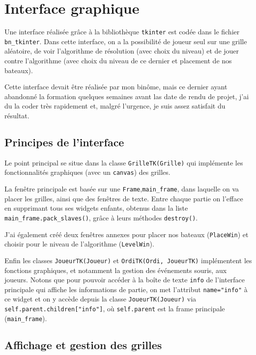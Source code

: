 \chapter{Interface graphique}

Une interface réalisée grâce à la bibliothèque \texttt{tkinter} est codée dans le fichier \texttt{bn\_tkinter}. Dans cette interface, on a la possibilité de joueur seul sur une grille aléatoire, de voir l'algorithme de résolution (avec choix du niveau) et de jouer contre l'algorithme (avec choix du niveau de ce dernier et placement de nos bateaux).

Cette interface devait être réalisée par mon binôme, mais ce dernier ayant abandonné la formation quelques semaines avant las date de rendu de projet, j'ai du la coder très rapidement et, malgré l'urgence, je suis assez satisfait du résultat.

\section{Principes de l'interface}

Le point principal se situe dans la classe \texttt{GrilleTK(Grille)} qui implémente les fonctionnalités graphiques (avec un \texttt{canvas}) des grilles.

La fenêtre principale est basée sur une \texttt{Frame},\texttt{main\_frame}, dans laquelle on va placer les grilles, ainsi que des fenêtres de texte. Entre chaque partie on l'efface en supprimant tous ses widgets enfants, obtenus dans la liste \texttt{main\_frame.pack\_slaves()}, grâce à leurs méthodes \texttt{destroy()}. 

J'ai également créé deux fenêtres annexes pour placer nos bateaux (\texttt{PlaceWin}) et choisir pour le niveau de l'algorithme (\texttt{LevelWin}).

Enfin les classes \texttt{JoueurTK(Joueur)} et \texttt{OrdiTK(Ordi, JoueurTK)} implémentent les fonctions graphiques, et notamment la gestion des événements souris, aux joueurs. Notons que pour pouvoir accéder à la boîte de texte \texttt{info} de l'interface principale qui affiche les informations de partie, on met l'attribut \texttt{name="info"} à ce widget et on y accède depuis la classe \texttt{JoueurTK(Joueur)} via \texttt{self.parent.children["info"]}, où \texttt{self.parent} est la frame principale (\texttt{main\_frame}).

\section{Affichage et gestion des grilles}